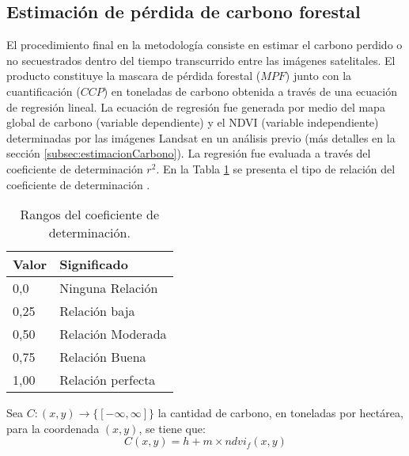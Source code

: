 \subsection{Estimaci\'on de p\'erdida de carbono forestal}
El procedimiento final en la metodolog\'ia consiste en estimar el carbono perdido o no secuestrados dentro del tiempo transcurrido entre las im\'agenes satelitales. El producto constituye la mascara de p\'erdida forestal ($ MPF $) junto con la cuantificaci\'on ($ CCP $) en toneladas de carbono obtenida a trav\'es de una ecuaci\'on de regresi\'on lineal. La ecuaci\'on de regresi\'on fue generada por medio del mapa global de carbono (variable dependiente) \cite{saatchi2011benchmark} y el NDVI (variable independiente) determinadas por las im\'agenes Landsat en un an\'alisis previo (m\'as detalles en la secci\'on \ref{subsec:estimacionCarbono}). La regresi\'on fue evaluada a trav\'es del coeficiente de determinaci\'on $ r^{2} $. En la Tabla \ref{t:coefDeter} se presenta el tipo de relaci\'on del coeficiente de determinaci\'on \cite{kris2014estimacionCorr}.
\begin{table}[H]
	\centering
	\begin{tabular}{|l|l|}
		\hline
		\textbf{Valor} & \textbf{Significado} \\ \hline
		0,0            & Ninguna Relaci\'on     \\ \hline
		0,25           & Relaci\'on baja        \\ \hline
		0,50           & Relaci\'on Moderada    \\ \hline
		0,75           & Relaci\'on Buena       \\ \hline
		1,00           & Relaci\'on perfecta    \\ \hline
	\end{tabular}
	\caption{Rangos del coeficiente de determinaci\'on.}
	\label{t:coefDeter}
\end{table}

Sea $ C:(x,y) \longrightarrow \{ [-\infty,\infty]\}$ la cantidad de carbono, en toneladas por hect\'area, para la coordenada $ (x,y) $, se tiene que: 
\begin{equation}\label{ec:regreLinelCarb}
C(x,y)=h+m \times ndvi_{f}(x,y)
\end{equation}

